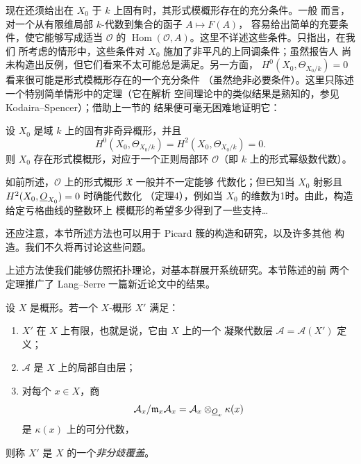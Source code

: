 现在还须给出在 $X_0$ 于 $k$ 上固有时，其形式模概形存在的充分条件。一般
而言，对一个从有限维局部 $k$-代数到集合的函子 $A\longmapsto F(A)$，
容易给出简单的充要条件，使它能够写成适当 $\mathcal O$ 的
$\operatorname{Hom}(\mathcal O,A)$。这里不详述这些条件。只指出，在我们
所考虑的情形中，这些条件对 $X_0$ 施加了非平凡的上同调条件；虽然报告人
尚未构造出反例，但它们看来不太可能总是满足。另一方面，
$H^0(X_0,\Theta_{X_0/k})=0$ 看来很可能是形式模概形存在的一个充分条件
（虽然绝非必要条件）。这里只陈述一个特别简单情形中的定理（它在解析
空间理论中的类似结果是熟知的，参见 Kodaira--Spencer）；借助上一节的
结果便可毫无困难地证明它：

 设 $X_0$ 是域 $k$ 上的固有非奇异概形，并且
\[
  H^0(X_0,\Theta_{X_0/k})=H^2(X_0,\Theta_{X_0/k})=0.
\]
则 $X_0$ 存在形式模概形，对应于一个正则局部环 $\mathcal O$（即 $k$
上的形式幂级数代数）。

如前所述，$\mathcal O$ 上的形式概形 $\mathfrak X$ 一般并不一定能够
代数化；但已知当 $X_0$ 射影且 $H^2(X_0,\underline{O}_{X_0})=0$ 时确能代数化
（定理4），例如当 $X_0$ 的维数为1时。由此，构造给定亏格曲线的整数环上
模概形的希望多少得到了一些支持\ldots{}

还应注意，本节所述方法也可以用于 Picard 簇的构造和研究，以及许多其他
构造。我们不久将再讨论这些问题。


上述方法使我们能够仿照拓扑理论，对基本群展开系统研究。本节陈述的前
两个定理推广了 Lang--Serre 一篇新近论文中的结果。

设 $X$ 是概形。若一个 $X$-概形 $X'$ 满足：
\begin{enumerate}
  \item[\textit{i.}] $X'$ 在 $X$ 上有限，也就是说，它由 $X$ 上的一个
    凝聚代数层 $\mathcal A=\mathcal A(X')$ 定义；
  \item[\textit{ii.}] $\mathcal A$ 是 $X$ 上的局部自由层；
  \item[\textit{iii.}] 对每个 $x\in X$，商
    \[
      \mathcal A_x/\mathfrak m_x\mathcal A_x
      =\mathcal A_x\otimes_{\underline{O}_x}\kappa(x)
    \]
    是 $\kappa(x)$ 上的可分代数，
\end{enumerate}
则称 $X'$ 是 $X$ 的一个\emph{非分歧覆盖}。


